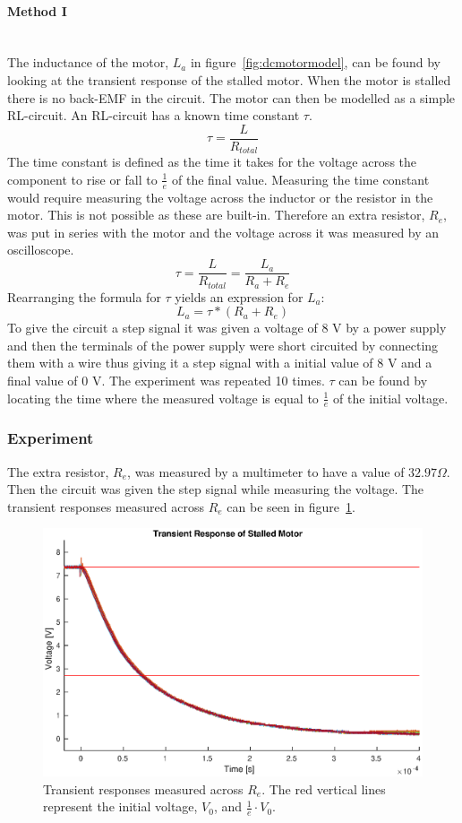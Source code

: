 \paragraph{Method I}~\\
The inductance of the motor, $L_a$ in figure~\ref{fig:dcmotormodel}, can be found by looking at the transient response of the stalled motor. 
When the motor is stalled there is no back-EMF in the circuit. The motor can then be modelled as a simple RL-circuit. 
An RL-circuit has a known time constant $\tau$.
$$\tau = \frac{L}{R_{total}}$$
The time constant is defined as the time it takes for the voltage across the component to rise or fall to $\frac{1}{e}$ of the final value.
Measuring the time constant would require measuring the voltage across the inductor or the resistor in the motor. This is not possible as these are built-in. 
Therefore an extra resistor, $R_e$, was put in series with the motor and the voltage across it was measured by an oscilloscope. 
$$\tau = \frac{L}{R_{total}} = \frac{L_a}{R_a+R_e}$$
Rearranging the formula for $\tau$ yields an expression for $L_a$: 
$$L_a = \tau * (R_a + R_e)$$
To give the circuit a step signal it was given a voltage of 8 V by a power supply and then the terminals of the power supply were short circuited by connecting them with a wire thus giving it a step signal with a initial value of 8 V and a final value of 0 V.
The experiment was repeated 10 times. $\tau$ can be found by locating the time where the measured voltage is equal to $\frac{1}{e}$ of the initial voltage.

\subsubsection{Experiment}
The extra resistor, $R_e$, was measured by a multimeter to have a value of $32.97\Omega$.
Then the circuit was given the step signal while measuring the voltage.
The transient responses measured across $R_e$ can be seen in figure~\ref{fig:trans_plot}.

\begin{figure}[!h]
	\centering
	\includegraphics[width=.75\linewidth]{graphics/transient_32ohm}
	\caption{Transient responses measured across $R_e$. The red vertical lines represent the initial voltage, $V_0$, and $\frac{1}{e} \cdot V_0$.}
	\label{fig:trans_plot}
\end{figure}


